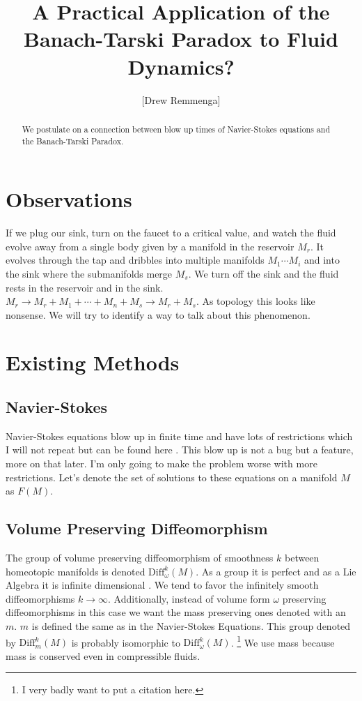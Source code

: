 \documentclass[10pt, oneside]{article}
\title{A Practical Application of the Banach-Tarski Paradox to Fluid Dynamics?}
\author{[Drew Remmenga]}
\begin{document}
\maketitle
\begin{abstract}
   We postulate on a connection between blow up times of Navier-Stokes equations and the Banach-Tarski Paradox.
\end{abstract}
\section*{Observations}
   If we plug our sink, turn on the faucet to a critical value, and watch the fluid evolve away from a single body given by a manifold in the reservoir $M_r$. It evolves through the tap and dribbles into multiple manifolds $M_1 \cdots M_i$ and into the sink where the submanifolds merge $M_s$.
   We turn off the sink and the fluid rests in the reservoir and in the sink. $M_r \to M_r + M_1 + \cdots + M_n + M_s \to M_r + M_s$. As topology this looks like nonsense. We will try to identify a way to talk about this phenomenon.
\section*{Existing Methods}
\subsection*{Navier-Stokes}
   Navier-Stokes equations blow up in finite time \cite{tao2015finitetimeblowupaveraged} and have lots of restrictions which I will not repeat but can be found here \cite{tao2015finitetimeblowupaveraged}. This blow up is not a bug but a feature, more on that later.
   I'm only going to make the problem worse with more restrictions. Let's denote the set of solutions to these equations on a manifold $M$ as $F(M)$.
\subsection*{Volume Preserving Diffeomorphism}
   The group of volume preserving diffeomorphism of smoothness $k$ between homeotopic manifolds is denoted $\text{Diff}^k_\omega(M)$. As a group it is perfect and as a Lie Algebra it is infinite dimensional \cite{Banyaga1997}. We tend to favor the infinitely smooth diffeomorphisms $k \to \infty$.
   Additionally, instead of volume form $\omega$ preserving diffeomorphisms in this case we want the mass preserving ones denoted with an $m$. $m$ is defined the same as in the Navier-Stokes Equations. This group denoted by $\text{Diff}^k_m(M)$ is probably isomorphic to $\text{Diff}^k_\omega(M)$. \footnote{I very badly want to put a citation here.}
   We use mass because mass is conserved even in compressible fluids.
\end{document}
